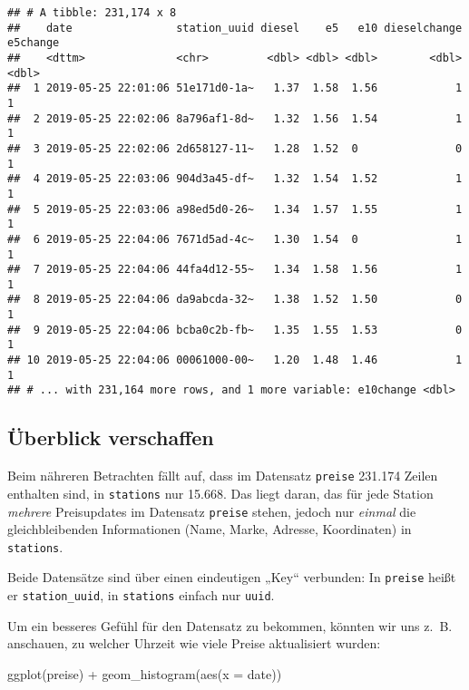 \documentclass[
  ngerman,
]{article}
\newenvironment{Shaded}{\begin{snugshade}}{\end{snugshade}}
\newcommand{\AttributeTok}[1]{\textcolor[rgb]{0.77,0.63,0.00}{#1}}
\newcommand{\FunctionTok}[1]{\textcolor[rgb]{0.00,0.00,0.00}{#1}}
\newcommand{\NormalTok}[1]{#1}
\newcommand{\SpecialCharTok}[1]{\textcolor[rgb]{0.00,0.00,0.00}{#1}}
\begin{document}
\begin{verbatim}
## # A tibble: 231,174 x 8
##    date                station_uuid diesel    e5   e10 dieselchange e5change
##    <dttm>              <chr>         <dbl> <dbl> <dbl>        <dbl>    <dbl>
##  1 2019-05-25 22:01:06 51e171d0-1a~   1.37  1.58  1.56            1        1
##  2 2019-05-25 22:02:06 8a796af1-8d~   1.32  1.56  1.54            1        1
##  3 2019-05-25 22:02:06 2d658127-11~   1.28  1.52  0               0        1
##  4 2019-05-25 22:03:06 904d3a45-df~   1.32  1.54  1.52            1        1
##  5 2019-05-25 22:03:06 a98ed5d0-26~   1.34  1.57  1.55            1        1
##  6 2019-05-25 22:04:06 7671d5ad-4c~   1.30  1.54  0               1        1
##  7 2019-05-25 22:04:06 44fa4d12-55~   1.34  1.58  1.56            1        1
##  8 2019-05-25 22:04:06 da9abcda-32~   1.38  1.52  1.50            0        1
##  9 2019-05-25 22:04:06 bcba0c2b-fb~   1.35  1.55  1.53            0        1
## 10 2019-05-25 22:04:06 00061000-00~   1.20  1.48  1.46            1        1
## # ... with 231,164 more rows, and 1 more variable: e10change <dbl>
\end{verbatim}

\hypertarget{uxfcberblick-verschaffen-1}{%
\subsection{Überblick verschaffen}\label{uxfcberblick-verschaffen-1}}

Beim nähreren Betrachten fällt auf, dass im Datensatz \texttt{preise} 231.174 Zeilen enthalten sind, in \texttt{stations} nur 15.668. Das liegt daran, das für jede Station \emph{mehrere} Preisupdates im Datensatz \texttt{preise} stehen, jedoch nur \emph{einmal} die gleichbleibenden Informationen (Name, Marke, Adresse, Koordinaten) in \texttt{stations}.

Beide Datensätze sind über einen eindeutigen „Key`` verbunden: In \texttt{preise} heißt er \texttt{station\_uuid}, in \texttt{stations} einfach nur \texttt{uuid}.

Um ein besseres Gefühl für den Datensatz zu bekommen, könnten wir uns z.~B. anschauen, zu welcher Uhrzeit wie viele Preise aktualisiert wurden:

\begin{Shaded}
\begin{Highlighting}[]
\FunctionTok{ggplot}\NormalTok{(preise) }\SpecialCharTok{+}
  \FunctionTok{geom\_histogram}\NormalTok{(}\FunctionTok{aes}\NormalTok{(}\AttributeTok{x =}\NormalTok{ date))}
\end{Highlighting}
\end{Shaded}
\end{document}
